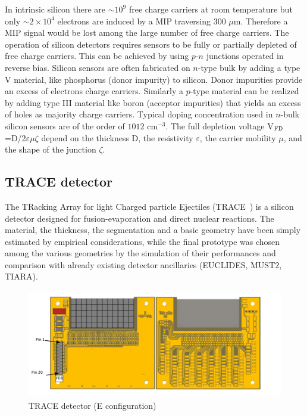 \bigbreak

In intrinsic silicon there are $\sim 10^9$ free charge carriers at room
temperature but only $\sim 2 \times 10^4$ electrons are induced by a MIP
traversing 300 $\mu$m. Therefore a MIP signal would be lost among the large
number of free charge carriers. The operation of silicon detectors requires
sensors to be fully or partially depleted of free charge carriers. This can
be achieved by using $p$-$n$ junctions operated in reverse bias. Silicon sensors
are often fabricated on $n$-type bulk by adding a type V material, like
phosphorus  (donor impurity) to silicon. Donor impurities provide an
excess of electrons charge carriers. Similarly a $p$-type material can be
realized by adding type III material like boron  (acceptor impurities)
that yields an excess of holes as majority charge carriers. Typical doping
concentration used in $n$-bulk silicon sensors are of the order of
$1012$ cm$^{-3}$. The full depletion voltage V$_{\textup{FD}}$=D/2$\varepsilon
\mu \zeta$ depend on the thickness D, the resistivity $\varepsilon$, the
carrier mobility $\mu$, and the shape of the junction $\zeta$.

\bigbreak

\subsection{TRACE detector}

The TRacking Array for light Charged particle Ejectiles (TRACE~\cite{mengoni2}) is a silicon
detector designed for fusion-evaporation and direct nuclear reactions.
The material, the thickness, the segmentation and a basic geometry have been
simply estimated by empirical considerations, while the final prototype was
chosen among the various geometries by the simulation of their performances
and comparison with already existing detector ancillaries (EUCLIDES, MUST2,
TIARA).

\bigbreak

\begin{figure}[h]
  \centering
  \includegraphics[scale=.65]{img/trace_e.png}
  \caption{TRACE detector (E configuration)}
  \label{chain}
\end{figure}

